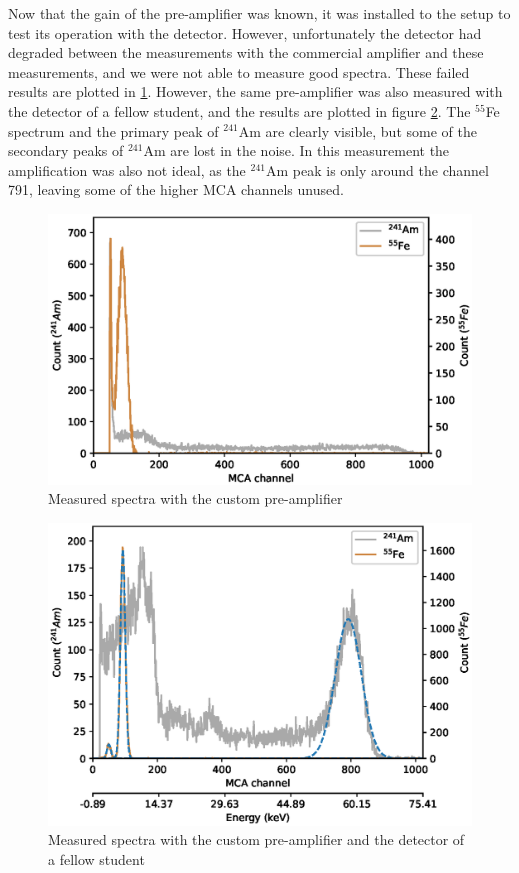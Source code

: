 \documentclass[a4paper]{article}
\begin{document}
\begin{appendices}
\FloatBarrier
Now that the gain of the pre-amplifier was known, it was installed to the setup to test its operation with the detector.
However, unfortunately the detector had degraded between the measurements with the commercial amplifier and these measurements, and we were not able to measure good spectra.
These failed results are plotted in \ref{fig:pre_amp_testing}.
However, the same pre-amplifier was also measured with the detector of a fellow student, and the results are plotted in figure \ref{fig:pre_amp_testing_nikita}.
The $^{55}$Fe spectrum and the primary peak of $^{241}$Am are clearly visible, but some of the secondary peaks of $^{241}$Am are lost in the noise.
In this measurement the amplification was also not ideal, as the $^{241}$Am peak is only around the channel 791, leaving some of the higher MCA channels unused.

\begin{figure}[ht!]
\centering
\includegraphics[width=\textwidth]{fig/python/spectra_custom_preamp}
\caption{Measured spectra with the custom pre-amplifier}
\label{fig:pre_amp_testing}
\end{figure}

\begin{figure}[ht!]
\centering
\includegraphics[width=\textwidth]{fig/python/spectra_custom_preamp_Nikitas_detector}
\caption{Measured spectra with the custom pre-amplifier and the detector of a fellow student}
\label{fig:pre_amp_testing_nikita}
\end{figure}



\end{appendices}
\end{document}
